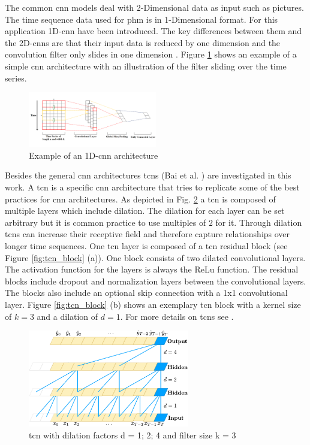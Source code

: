 \documentclass[conference]{IEEEtran}
\begin{document}
The common \gls{cnn} models deal with 2-Dimensional data as input such as pictures. The time sequence data used for \gls{phm} is in 1-Dimensional format. For this application 1D-\gls{cnn} have been introduced. The key differences between them and the 2D-\glspl{cnn} are that their input data is reduced by one dimension and the convolution filter only slides in one dimension \cite{Akrim2021}. Figure \ref{fig:1D_cnn_architecture} shows an example of a simple \gls{cnn} architecture with an illustration of the filter sliding over the time series. 

\begin{figure}[htp]
	\centering
	\includegraphics[width=0.5\textwidth]{1D_CNN_Architecture.png}
	\caption{Example of an 1D-\gls{cnn} architecture \cite{Sayyad}}
	\label{fig:1D_cnn_architecture}
\end{figure}

Besides the general \gls{cnn} architectures \glspl{tcn} (Bai et al. \cite{Bai2018}) are investigated in this work. A \gls{tcn} is a specific \gls{cnn} architecture that tries to replicate some of the best practices for \gls{cnn} architectures. As depicted in Fig. \ref{fig:tcn_architecture} a \gls{tcn} is composed of multiple layers which include dilation. The dilation for each layer can be set arbitrary but it is common practice to use multiples of $ 2 $ for it. Through dilation \glspl{tcn} can increase their receptive field and therefore capture relationships over longer time sequences. One \gls{tcn} layer is composed of a \gls{tcn} residual block (see Figure \ref{fig:tcn_block} (a)). One block consists of two dilated convolutional layers. The activation function for the layers is always the ReLu function. The residual blocks include dropout and normalization layers between the convolutional layers. The blocks also include an optional skip connection with a 1x1 convolutional layer. Figure \ref{fig:tcn_block} (b) shows an exemplary \gls{tcn} block with a kernel size of $ k = 3 $ and a dilation of $ d = 1 $. For more details on \glspl{tcn} see \cite{Bai2018}.

\begin{figure}[htp]
	\centering
	\includegraphics[width=7cm]{tcn_architecture.pdf}
	\caption{\gls{tcn} with dilation factors d = 1; 2; 4 and filter size k = 3 \cite{Bai2018}}
	\label{fig:tcn_architecture}
\end{figure}
\end{document}
